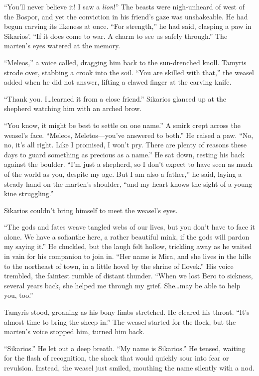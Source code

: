 ``You'll never believe it! I saw a \emph{lion}!'' The beasts were nigh-unheard of west of the Bospor, and yet the conviction in his friend's gaze was unshakeable. He had begun carving its likeness at once. ``For strength,'' he had said, clasping a paw in Sikarios'. ``If it does come to war. A charm to see us safely through.'' The marten's eyes watered at the memory.

``Meleos,'' a voice called, dragging him back to the sun-drenched knoll. Tamyris strode over, stabbing a crook into the soil. ``You are skilled with that,'' the weasel added when he did not answer, lifting a clawed finger at the carving knife.

``Thank you. I\ldots{}learned it from a close friend.'' Sikarios glanced up at the shepherd watching him with an arched brow.

``You know, it might be best to settle on one name.'' A smirk crept across the weasel's face. ``Meleos, Meletos---you've answered to both.'' He raised a paw. ``No, no, it's all right. Like I promised, I won't pry. There are plenty of reasons these days to guard something as precious as a name.'' He sat down, resting his back against the boulder. ``I'm just a shepherd, so I don't expect to have seen as much of the world as you, despite my age. But I am also a father,'' he said, laying a steady hand on the marten's shoulder, ``and my heart knows the sight of a young kine struggling.''

Sikarios couldn't bring himself to meet the weasel's eyes.

``The gods and fates weave tangled webs of our lives, but you don't have to face it alone. We have a sofianthe here, a rather beautiful mink, if the gods will pardon my saying it.'' He chuckled, but the laugh felt hollow, trickling away as he waited in vain for his companion to join in. ``Her name is Mira, and she lives in the hills to the northeast of town, in a little hovel by the shrine of Ilovek.'' His voice trembled, the faintest rumble of distant thunder. ``When we lost Bero to sickness, several years back, she helped me through my grief. She\ldots{}may be able to help you, too.''

Tamyris stood, groaning as his bony limbs stretched. He cleared his throat. ``It's almost time to bring the sheep in.'' The weasel started for the flock, but the marten's voice stopped him, turned him back.

``Sikarios.'' He let out a deep breath. ``My name is Sikarios.'' He tensed, waiting for the flash of recognition, the shock that would quickly sour into fear or revulsion. Instead, the weasel just smiled, mouthing the name silently with a nod.

